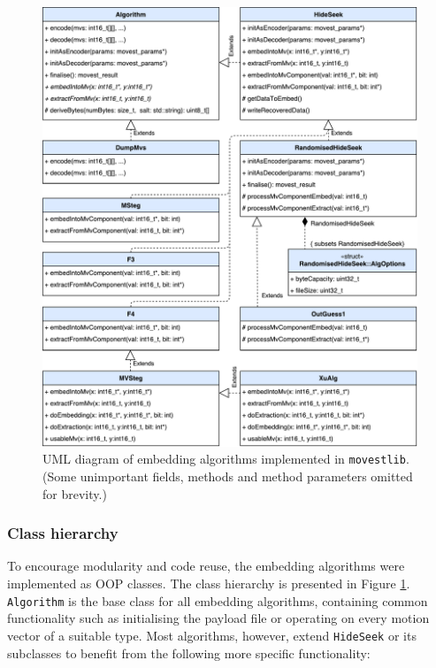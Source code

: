\documentclass[12pt,british,twoside,notitlepage,usenames,dvipsnames,hypens,final]{report}
\numberwithin{equation}{section}
\numberwithin{figure}{section}
\begin{document}
\begin{figure}[!htbp]
\centering
\captionsetup{width=\textwidth}
\includegraphics[width=\textwidth]{img/movest_alg_class_diag.pdf}
\caption{UML diagram of embedding algorithms implemented in \texttt{movestlib}. (Some unimportant fields, methods and method parameters omitted for brevity.)}
\label{fig:movest_alg_class_diag}
\end{figure}

\subsubsection{Class hierarchy}

To encourage modularity and code reuse, the embedding algorithms were implemented as OOP classes. The class hierarchy is presented in Figure \ref{fig:movest_alg_class_diag}. \texttt{Algorithm} is the base class for all embedding algorithms, containing common functionality such as initialising the payload file or operating on every motion vector of a suitable type. Most algorithms, however, extend \texttt{HideSeek} or its subclasses to benefit from the following more specific functionality:
\end{document}
